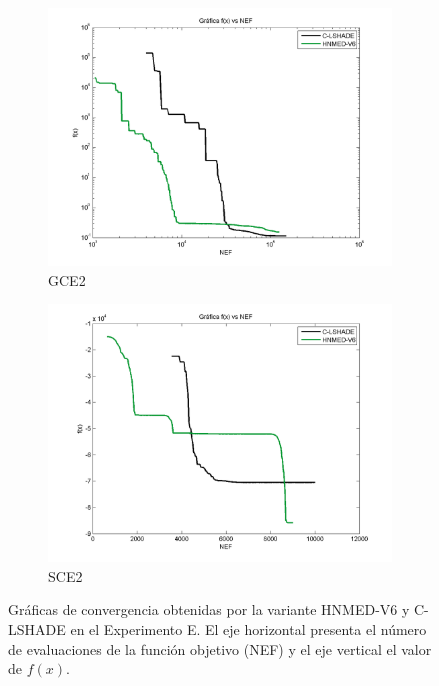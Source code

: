 \begin{figure}
\begin{subfigure}[b]{0.49\linewidth}
		\includegraphics[width=\linewidth]{Figures/E-Grafica_Convergencia_Problema_5}
		\caption{GCE2} \label{fig:G2} 
	\end{subfigure}
	\begin{subfigure}[b]{0.49\linewidth}
		\includegraphics[width=\linewidth]{Figures/E-Grafica_Convergencia_Problema_6}
		\caption{SCE2} \label{fig:S1} 
	\end{subfigure}
	\caption[Gráficas de convergencia obtenidas por la variante HNMED-V6 y C-LSHADE en el Experimento E.]{Gráficas de convergencia obtenidas por la variante HNMED-V6 y C-LSHADE en el Experimento E. El eje horizontal presenta el número de evaluaciones de la función objetivo (NEF) y el eje vertical el valor de  $f(x)$.} \label{fig: Gráficas de convergencia obtenidas por HNMED-V6 y CLSHADE para el Experimento E.} 
	
\end{figure}


